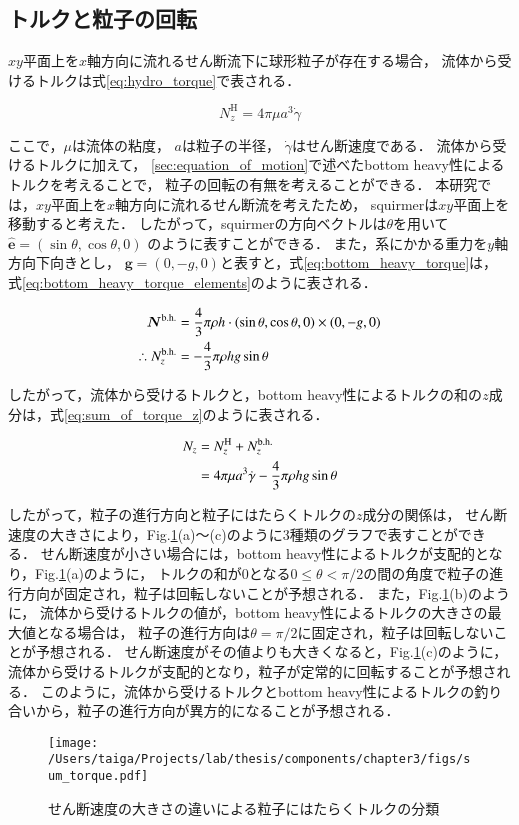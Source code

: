 \subsection{トルクと粒子の回転}
\label{sec:rotation}
$xy$平面上を$x$軸方向に流れるせん断流下に球形粒子が存在する場合，
流体から受けるトルクは式\eqref{eq:hydro_torque}で表される\cite{}．

    \begin{equation}
        N^\mathrm{H}_z = 4 \pi \mu a^3 \dot{\gamma}
        \label{eq:hydro_torque}
    \end{equation}

\noindent
ここで，$\mu$は流体の粘度，
$a$は粒子の半径，
$\dot{\gamma}$はせん断速度である．
流体から受けるトルクに加えて，
\ref{sec:equation_of_motion}で述べたbottom heavy性によるトルクを考えることで，
粒子の回転の有無を考えることができる．
本研究では，$xy$平面上を$x$軸方向に流れるせん断流を考えたため，
squirmerは$xy$平面上を移動すると考えた．
したがって，squirmerの方向ベクトルは$\theta$を用いて
$\boldsymbol{\hat{e}} = (\sin{\theta}, \cos{\theta}, 0)$
のように表すことができる．
また，系にかかる重力を$y$軸方向下向きとし，
$\boldsymbol{g} = (0, -g, 0)$と表すと，式\ref{eq:bottom_heavy_torque}は，
式\eqref{eq:bottom_heavy_torque_elements}のように表される．

    \begin{align}
        \boldsymbol{N}^\mathrm{b.h.} &= \frac{4}{3} \pi \rho h \cdot (\sin{\theta}, \cos{\theta}, 0) \times (0, -g, 0) \notag \\
        \therefore N^\mathrm{b.h.}_z &= - \frac{4}{3} \pi \rho h g \sin{\theta}
        \label{eq:bottom_heavy_torque_elements}
    \end{align}

\noindent
したがって，流体から受けるトルクと，bottom heavy性によるトルクの和の$z$成分は，式\eqref{eq:sum_of_torque_z}のように表される．

    \begin{align}
        N_z &= N^\mathrm{H}_z + N^\mathrm{b.h.}_z \notag \\
            &= 4 \pi \mu a^3 \dot{\gamma} - \frac{4}{3} \pi \rho h g \sin{\theta}
        \label{eq:sum_of_torque_z}
    \end{align}

\noindent
したがって，粒子の進行方向と粒子にはたらくトルクの$z$成分の関係は，
せん断速度の大きさにより，Fig.\ref{fig:sum_torque}(a)〜(c)のように3種類のグラフで表すことができる．
せん断速度が小さい場合には，bottom heavy性によるトルクが支配的となり，Fig.\ref{fig:sum_torque}(a)のように，
トルクの和が0となる$0 \leq \theta < \pi / 2$の間の角度で粒子の進行方向が固定され，粒子は回転しないことが予想される．
また，Fig.\ref{fig:sum_torque}(b)のように，
流体から受けるトルクの値が，bottom heavy性によるトルクの大きさの最大値となる場合は，
粒子の進行方向は$\theta = \pi / 2$に固定され，粒子は回転しないことが予想される．
せん断速度がその値よりも大きくなると，Fig.\ref{fig:sum_torque}(c)のように，
流体から受けるトルクが支配的となり，粒子が定常的に回転することが予想される．
このように，流体から受けるトルクとbottom heavy性によるトルクの釣り合いから，粒子の進行方向が異方的になることが予想される．

\begin{figure}[H]
    \centering
    \texttt{[image: /Users/taiga/Projects/lab/thesis/components/chapter3/figs/sum\_torque.pdf]}
    \caption{せん断速度の大きさの違いによる粒子にはたらくトルクの分類}
    \label{fig:sum_torque}
\end{figure}
